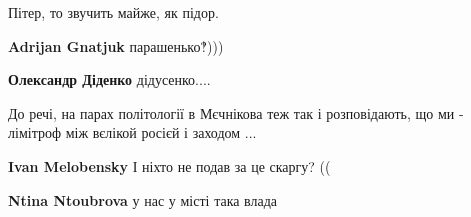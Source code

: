 \begin{itemize}
 
Пітер, то звучить майже, як підор.

\begin{itemize}
 
\textbf{Adrijan Gnatjuk} парашенько‽)))

 
\textbf{Олександр Діденко} дідусенко....
\end{itemize}

 

До речі, на парах політології в Мєчнікова теж так і розповідають, що ми -
лімітроф між вєлікой росієй і заходом ...

\begin{itemize}
 
\textbf{Ivan Melobensky} І ніхто не подав за це скаргу? ((

 
\textbf{Ntina Ntoubrova} у нас у місті така влада
\end{itemize}


\end{itemize}
